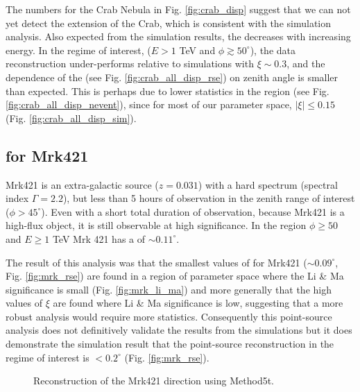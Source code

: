 \documentclass[main.tex]{subfiles}
\begin{document}
The numbers for the Crab Nebula in Fig. \ref{fig:crab_disp} suggest that we can not yet detect the extension of the Crab, which is consistent with the simulation analysis. Also expected from the simulation results, the \rse decreases with increasing energy. In the regime of interest, ($E>1$ TeV and $\phi\gtrsim 50^\circ$), the data reconstruction under-performs relative to simulations with $\xi\sim 0.3$, and the dependence of the \rse (see Fig. \ref{fig:crab_all_disp_rse}) on zenith angle is smaller than expected. This is perhaps due to lower statistics in the region (see Fig. \ref{fig:crab_all_disp_nevent}), since for most of our parameter space, $|\xi| \leq 0.15$ (Fig. \ref{fig:crab_all_disp_sim}).

\subsection{\rse for Mrk421}
Mrk421 is an extra-galactic source ($z=0.031$) with a hard spectrum (spectral index $\Gamma=2.2$), but less than 5 hours of observation in the zenith range of interest ($\phi>45^\circ$). Even with a short total duration of observation, because Mrk421 is a high-flux object, it is still observable at high significance. In the region $\phi\geq50$ and $E\geq 1$ TeV Mrk 421 has a \rse of $\sim 0.11^\circ$.

The result of this analysis was that the smallest values of \rse for Mrk421 ($\sim 0.09^\circ$, Fig. \ref{fig:mrk_rse}) are found in a region of parameter space where the Li \& Ma significance is small (Fig. \ref{fig:mrk_li_ma}) and more generally that the high values of $\xi$ are found where Li \& Ma significance is low, suggesting that a more robust analysis would require more statistics. Consequently this point-source analysis does not definitively validate the results from the simulations but it does demonstrate the simulation result that the point-source reconstruction in the regime of interest is $<0.2^\circ$ (Fig. \ref{fig:mrk_rse}).
\begin{figure}[H]
  \begin{center}
  \end{center}
  \caption[Mrk421 skymaps using the new \disp tables.]{Reconstruction of the Mrk421 direction using Method5t.}
\end{figure}
\end{document}
